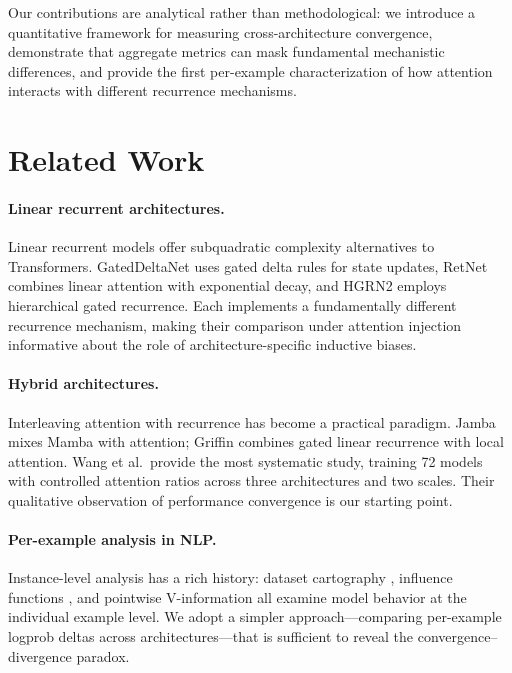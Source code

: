 \documentclass[11pt,a4paper]{article}
\begin{document}
Our contributions are analytical rather than methodological: we introduce a quantitative framework for measuring cross-architecture convergence, demonstrate that aggregate metrics can mask fundamental mechanistic differences, and provide the first per-example characterization of how attention interacts with different recurrence mechanisms.

\section{Related Work}

\paragraph{Linear recurrent architectures.}
Linear recurrent models offer subquadratic complexity alternatives to Transformers. GatedDeltaNet \citep{yang2024gateddeltanetworks} uses gated delta rules for state updates, RetNet \citep{sun2023retentive} combines linear attention with exponential decay, and HGRN2 \citep{qin2024hgrn2} employs hierarchical gated recurrence. Each implements a fundamentally different recurrence mechanism, making their comparison under attention injection informative about the role of architecture-specific inductive biases.

\paragraph{Hybrid architectures.}
Interleaving attention with recurrence has become a practical paradigm. Jamba \citep{lieber2024jamba} mixes Mamba with attention; Griffin \citep{de2024griffin} combines gated linear recurrence with local attention. Wang et al.\ provide the most systematic study, training 72 models with controlled attention ratios across three architectures and two scales. Their qualitative observation of performance convergence is our starting point.

\paragraph{Per-example analysis in NLP.}
Instance-level analysis has a rich history: dataset cartography \citep{swayamdipta2020dataset}, influence functions \citep{koh2017understanding}, and pointwise V-information \citep{ethayarajh2022understanding} all examine model behavior at the individual example level. We adopt a simpler approach---comparing per-example logprob deltas across architectures---that is sufficient to reveal the convergence--divergence paradox.
\end{document}
